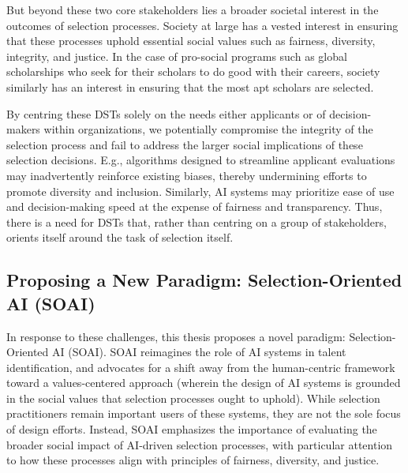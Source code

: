But beyond these two core stakeholders lies a broader societal interest in the outcomes of selection processes. Society at large has a vested interest in ensuring that these processes uphold essential social values such as fairness, diversity, integrity, and justice. In the case of pro-social programs such as global scholarships who seek for their scholars to do good with their careers, society similarly has an interest in ensuring that the most apt scholars are selected.

By centring these DSTs solely on the needs either applicants or of decision-makers within organizations, we potentially compromise the integrity of the selection process and fail to address the larger social implications of these selection decisions. E.g., algorithms designed to streamline applicant evaluations may inadvertently reinforce existing biases, thereby undermining efforts to promote diversity and inclusion. Similarly, AI systems may prioritize ease of use and decision-making speed at the expense of fairness and transparency. Thus, there is a need for DSTs that, rather than centring on a group of stakeholders, orients itself around the task of selection itself.

\subsection{Proposing a New Paradigm: Selection-Oriented AI (SOAI)}
In response to these challenges, this thesis proposes a novel paradigm: Selection-Oriented AI (SOAI). SOAI reimagines the role of AI systems in talent identification, and advocates for a shift away from the human-centric framework toward a values-centered approach (wherein the design of AI systems is grounded in the social values that selection processes ought to uphold). While selection practitioners remain important users of these systems, they are not the sole focus of design efforts. Instead, SOAI emphasizes the importance of evaluating the broader social impact of AI-driven selection processes, with particular attention to how these processes align with principles of fairness, diversity, and justice. %



